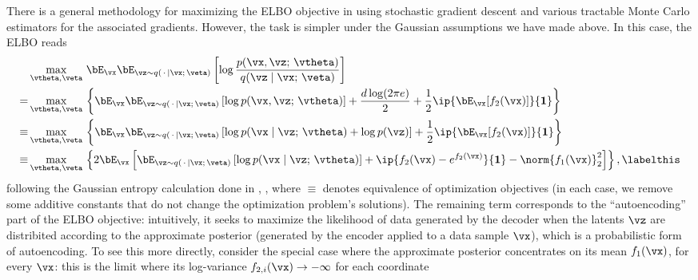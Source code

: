 \documentclass[../../book-main.tex]{subfiles}
\begin{document}
There is a general methodology for maximizing the ELBO objective in
 using stochastic gradient descent and various tractable
Monte Carlo estimators for the associated gradients. However, the task is
simpler under the Gaussian assumptions we have made above. In this case, the
ELBO reads
\begin{align*}
&\max_{\vtheta, \veta}\,
\bE_{\vx}
\bE_{\vz \sim q(\,\cdot\, \mid \vx ;\, \veta)} \left[
  \log \frac{p(\vx, \vz;\, \vtheta)}{q(\vz \mid \vx;\, \veta)}
\right]\\
=&
\max_{\vtheta, \veta}\,
\left\{
  \bE_{\vx}
  \bE_{\vz \sim q(\,\cdot\, \mid \vx ;\, \veta)} \left[
    \log p(\vx, \vz;\, \vtheta)
  \right]
  + \frac{d \log(2\pi e)}{2}
  + \frac{1}{2} \ip{ \bE_{\vx}[f_2(\vx)]}{\mathbf{1}}
\right\}
\\
\equiv &
\max_{\vtheta, \veta}\,
\left\{
  \bE_{\vx}
  \bE_{\vz \sim q(\,\cdot\, \mid \vx ;\, \veta)} \left[
    \log p(\vx \mid \vz;\, \vtheta)
    + \log p(\vz)
  \right]
  + \frac{1}{2} \ip{ \bE_{\vx}[f_2(\vx)]}{\mathbf{1}}
\right\}
\\
\equiv &
\max_{\vtheta, \veta}\,
\left\{
  2\bE_{\vx}\left[
    \bE_{\vz \sim q(\,\cdot\, \mid \vx ;\, \veta)} \left[
      \log p(\vx \mid \vz;\, \vtheta)
    \right]
    + \ip{ f_2(\vx) - e^{f_2(\vx)}}{\mathbf{1}}
    - \norm{f_1(\vx)}_2^2
  \right]
\right\}, \labelthis \label{eq:elbo-for-gaussians}
\end{align*}
following the Gaussian entropy calculation done in
, , where $\equiv$
denotes equivalence of optimization objectives (in each case, we remove some
additive constants that do not change the optimization problem's solutions).
The remaining term corresponds to the ``autoencoding'' part of the ELBO
objective: intuitively, it seeks to maximize the likelihood of data generated by
the decoder when the latents $\vz$ are distribited according to the approximate
posterior (generated by the encoder applied to a data sample $\vx$), which is
a probabilistic form of autoencoding.
To see this more directly, consider the special case where the approximate
posterior concentrates on its mean $f_1(\vx)$, for every $\vx$: this
is the limit
where its log-variance $f_{2,i}(\vx) \to -\infty$ for each coordinate
\end{document}
